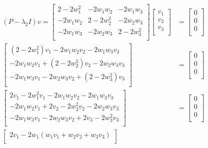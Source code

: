 \begin{align*}
    (P - \lambda_2 I)v = \begin{bmatrix}
        2 - 2 w_1^2 & -2 w_1 w_2 & -2 w_1 w_3 \\
        -2 w_1 w_2 & 2 - 2 w_2^2 & -2 w_2 w_3 \\
        -2 w_1 w_3 & -2 w_2 w_3 & 2 - 2 w_3^2\\
    \end{bmatrix} \begin{bmatrix}
        v_1 \\ v_2 \\ v_3 \\
    \end{bmatrix} &= \begin{bmatrix}
        0 \\ 0 \\ 0 \\
    \end{bmatrix} \\  
    \begin{bmatrix}
        (2-2w_1^2) v_1 - 2w_1 w_2 v_2 - 2w_1 w_3 v_3 \\
        -2w_1 w_2 v_1 + (2-2w_2^2) v_2 - 2w_2 w_3 v_3 \\
        -2w_1 w_3 v_1 - 2w_2 w_3 v_2 + (2-2w_3^2) v_3 \\
    \end{bmatrix} &= \begin{bmatrix}
        0 \\ 0 \\ 0 \\
    \end{bmatrix} \\ 
    \begin{bmatrix}
        2v_1 - 2w_1^2 v_1 - 2w_1 w_2 v_2 - 2w_1 w_3 v_3 \\
        -2w_1 w_2 v_1 + 2v_2 - 2w_2^2 v_2 - 2w_2 w_3 v_3 \\
        -2w_1 w_3 v_1 - 2w_2 w_3 v_2 + 2v_3 - 2w_3^2 v_3 \\
    \end{bmatrix} &= \begin{bmatrix}
        0 \\ 0 \\ 0 \\
    \end{bmatrix} \\ 
    \begin{bmatrix}
        2v_1 -2w_1 (w_1 v_1 + w_2 v_2 + w_3 v_3) \\

\end{bmatrix}
\end{align*}

